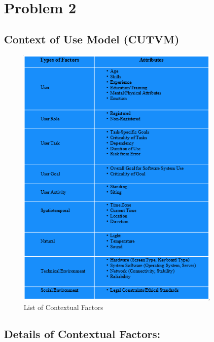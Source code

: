 \documentclass[11pt,oneside]{book}
\begin{document}
\chapter{Problem 2}
\section{Context of Use Model (CUTVM)}

\begin{figure}[htp]
\includegraphics[width = 10cm]{images/prob2.PNG} 
    \centering
    \caption{List of Contextual Factors }
\end{figure}
\newpage

\section{Details of Contextual Factors:}
\end{document}
